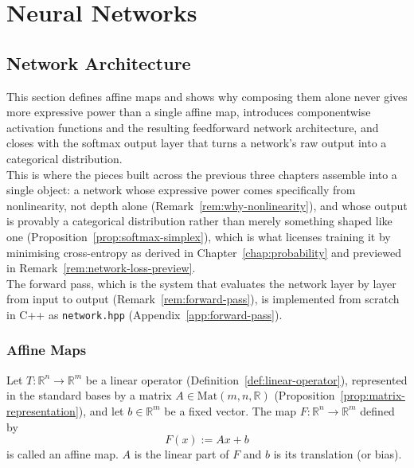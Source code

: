 \chapter{Neural Networks}
\label{chap:neural-networks}

\section{Network Architecture}
\label{sec:network-architecture}
	
	This section defines affine maps and shows why composing them alone never gives more expressive power than a single affine map, introduces componentwise activation functions and the resulting feedforward network architecture, and closes with the softmax output layer that turns a network's raw output into a categorical distribution. \\
	
	This is where the pieces built across the previous three chapters assemble into a single object: a network whose expressive power comes specifically from nonlinearity, not depth alone (Remark~\ref{rem:why-nonlinearity}), and whose output is provably a categorical distribution rather than merely something shaped like one (Proposition~\ref{prop:softmax-simplex}), which is what licenses training it by minimising cross-entropy as derived in Chapter~\ref{chap:probability} and previewed in Remark~\ref{rem:network-loss-preview}. \\
	
	The forward pass, which is the system that evaluates the network layer by layer from input to output (Remark~\ref{rem:forward-pass}), is implemented from scratch in C++ as \texttt{network.hpp} (Appendix~\ref{app:forward-pass}).
	
	\subsection{Affine Maps}
		
		\begin{definition}
			\label{def:affine-map}
			Let $T:\mathbb{R}^n\to\mathbb{R}^m$ be a linear operator (Definition~\ref{def:linear-operator}), represented in the standard bases by a matrix $A\in\mathrm{Mat}(m,n,\mathbb{R})$ (Proposition~\ref{prop:matrix-representation}), and let $b\in\mathbb{R}^m$ be a fixed vector. The map $F:\mathbb{R}^n\to\mathbb{R}^m$ defined by
			\[
				F(x) := Ax + b
			\]
			is called an affine map. $A$ is the linear part of $F$ and $b$ is its translation (or bias).
		\end{definition}
		
